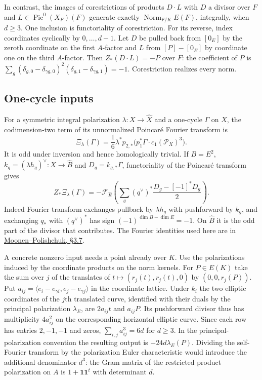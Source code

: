 \documentclass[11pt]{article}
\begin{document}
In contrast, the images of corestrictions of products $D\cdot L$
with $D$ a divisor over $F$ and $L\in\operatorname{Pic}^0(X_F)(F)$
generate exactly $\operatorname{Norm}_{F/K}E(F)$, integrally, when
$d\ge3$. One inclusion is functoriality of corestriction. For its
reverse, index coordinates cyclically by $0,\dots,d-1$. Let
$D$ be pulled back from $[0_E]$ by the zeroth coordinate on the
first $A$-factor and $L$ from $[P]-[0_E]$ by coordinate one on
the third $A$-factor. Then
$Z_*(D\cdot L)=-P$ over $F$: the coefficient of $P$ is
$\sum_g(\delta_{g,0}-\delta_{\gamma g,0})^2
(\delta_{g,1}-\delta_{\gamma g,1})=-1$.
Corestriction realizes every norm.

\subsection*{One-cycle inputs}
For a symmetric integral polarization $\lambda:X\to\widehat X$ and a
one-cycle $\Gamma$ on $X$, the codimension-two term of its unnormalized
Poincar\'e Fourier transform is
\[
 \Xi_\lambda(\Gamma)=\frac16\lambda^*p_{2,*}
      \bigl(p_1^*\Gamma\cdot c_1(\mathcal P_X)^3\bigr).
\]
It is odd under inversion and hence homologically trivial. If
$B=E^2$, $k_g=(\lambda h_g)^\vee:X\to\widehat B$ and
$D_g=k_{g,*}\Gamma$, functoriality of the Poincar\'e transform gives
\[
 Z_*\Xi_\lambda(\Gamma)=
 -\mathcal F_{\widehat E}\left(\sum_g(q^\vee)^*
                  \frac{D_g-[-1]^*D_g}{2}\right).
\]
Indeed Fourier transform exchanges pullback by $\lambda h_g$ with
pushforward by $k_g$, and exchanging $q_*$ with $(q^\vee)^*$ has
sign $(-1)^{\dim B-\dim E}=-1$. On $\widehat B$ it is the odd part
of the divisor that contributes. The Fourier identities used here are
in \href{https://arxiv.org/abs/0904.3995}{Moonen--Polishchuk, \S3.7}.

A concrete nonzero input needs a point already over $K$. Use the
polarizations induced by the coordinate products on the norm kernels.
For $P\in E(K)$ take the sum over $j$ of the translates of
$t\mapsto(r_j(t),r_j(t),0)$ by $(0,0,r_j(P))$. Put
$a_{ij}=\langle e_i-e_{\gamma i},e_j-e_{\gamma j}\rangle$ in the
coordinate lattice. Under $k_i$ the two elliptic coordinates of the
$j$th translated curve, identified with their duals by the principal
polarization $\lambda_E$, are $2a_{ij}t$ and $a_{ij}P$.
Its pushforward divisor thus has multiplicity $4a_{ij}^2$ on the
corresponding horizontal elliptic curve. Since each row has entries
$2,-1,-1$ and zeros, $\sum_{i,j} a_{ij}^3=6d$ for $d\ge3$.
In the principal-polarization convention the resulting output is
$-24d\lambda_E(P)$. Dividing the self-Fourier transform by the
polarization Euler characteristic would introduce the additional
denominator $d^3$: the Gram matrix of the restricted product
polarization on $A$ is $1+\mathbf1\mathbf1^t$ with determinant $d$.
\end{document}
